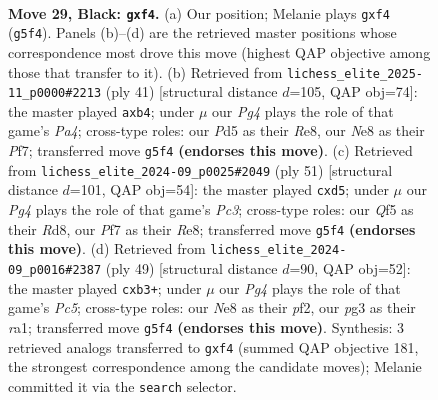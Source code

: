 \documentclass[11pt]{article}
\begin{document}
\clearpage

\begin{figure}[p]\centering
\begin{subfigure}{0.46\textwidth}\centering
\resizebox{\linewidth}{!}{%
\newchessgame
\chessboard[
  setfen={1r1rn1k1/p1p2p2/8/2Pp1qpp/5P2/1P2P1P1/1Q1B2RP/4KBR1 b - - 1 29},
  showmover=false,
  pgfstyle=straightmove, color=movearrow, markmove={g5-f4}
]}
\caption{}
\end{subfigure}\hfill
\begin{subfigure}{0.46\textwidth}\centering
\resizebox{\linewidth}{!}{%
\newchessgame
\chessboard[
  setfen={r3r1k1/1p3ppp/2ppn3/p5q1/1PP5/P2PP1P1/3Q2BP/1R3RK1 b - - 2 21},
  showmover=false,
  pgfstyle=straightmove, color=movearrow, markmove={a5-b4}
]}
\caption{}
\end{subfigure}
\\[4pt]
\begin{subfigure}{0.46\textwidth}\centering
\resizebox{\linewidth}{!}{%
\newchessgame
\chessboard[
  setfen={3rrbk1/1pq2p2/2p3p1/p2P2P1/2P2nQ1/1P6/PB1R2BP/R5K1 b - - 1 26},
  showmover=false,
  pgfstyle=straightmove, color=movearrow, markmove={c6-d5}
]}
\caption{}
\end{subfigure}\hfill
\begin{subfigure}{0.46\textwidth}\centering
\resizebox{\linewidth}{!}{%
\newchessgame
\chessboard[
  setfen={r6r/p4k2/q1pbp1p1/8/2pPp2P/1P2P2Q/P4P2/R3BK1R b - - 1 25},
  showmover=false,
  pgfstyle=straightmove, color=movearrow, markmove={c4-b3}
]}
\caption{}
\end{subfigure}
\caption{\textbf{Move 29, Black: \texttt{gxf4}.} (a) Our position; Melanie plays \texttt{gxf4} (\texttt{g5f4}). Panels (b)--(d) are the retrieved master positions whose correspondence most drove this move (highest QAP objective among those that transfer to it). (b) Retrieved from \texttt{lichess\_elite\_2025-11\_p0000\#2213} (ply 41) [structural distance $d$=105, QAP obj=74]: the master played \texttt{axb4}; under $\mu$ our \emph{Pg4} plays the role of that game's \emph{Pa4}; cross-type roles: our \emph{P}d5 as their \emph{R}e8, our \emph{N}e8 as their \emph{P}f7; transferred move \texttt{g5f4} \textbf{(endorses this move)}. (c) Retrieved from \texttt{lichess\_elite\_2024-09\_p0025\#2049} (ply 51) [structural distance $d$=101, QAP obj=54]: the master played \texttt{cxd5}; under $\mu$ our \emph{Pg4} plays the role of that game's \emph{Pc3}; cross-type roles: our \emph{Q}f5 as their \emph{R}d8, our \emph{P}f7 as their \emph{R}e8; transferred move \texttt{g5f4} \textbf{(endorses this move)}. (d) Retrieved from \texttt{lichess\_elite\_2024-09\_p0016\#2387} (ply 49) [structural distance $d$=90, QAP obj=52]: the master played \texttt{cxb3+}; under $\mu$ our \emph{Pg4} plays the role of that game's \emph{Pc5}; cross-type roles: our \emph{N}e8 as their \emph{p}f2, our \emph{p}g3 as their \emph{r}a1; transferred move \texttt{g5f4} \textbf{(endorses this move)}. Synthesis: 3 retrieved analogs transferred to \texttt{gxf4} (summed QAP objective 181, the strongest correspondence among the candidate moves); Melanie committed it via the \texttt{search} selector.}
\label{fig:thought-m57}
\end{figure}
\end{document}
